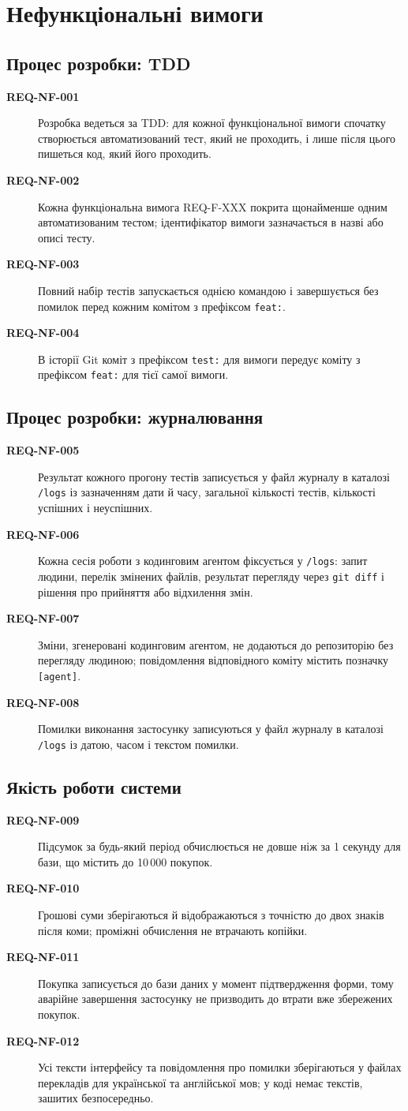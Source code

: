 \documentclass[12pt,a4paper]{article}
\newcommand{\req}[2]{\item[\textbf{#1}] #2}
\begin{document}
\section{Нефункціональні вимоги}

\subsection{Процес розробки: TDD}
\begin{description}
\req{REQ-NF-001}{Розробка ведеться за TDD: для кожної функціональної вимоги спочатку створюється автоматизований тест, який не проходить, і лише після цього пишеться код, який його проходить.}
\req{REQ-NF-002}{Кожна функціональна вимога REQ-F-XXX покрита щонайменше одним автоматизованим тестом; ідентифікатор вимоги зазначається в назві або описі тесту.}
\req{REQ-NF-003}{Повний набір тестів запускається однією командою і завершується без помилок перед кожним комітом з префіксом \texttt{feat:}.}
\req{REQ-NF-004}{В історії Git коміт з префіксом \texttt{test:} для вимоги передує коміту з префіксом \texttt{feat:} для тієї самої вимоги.}
\end{description}

\subsection{Процес розробки: журналювання}
\begin{description}
\req{REQ-NF-005}{Результат кожного прогону тестів записується у файл журналу в каталозі \texttt{/logs} із зазначенням дати й часу, загальної кількості тестів, кількості успішних і неуспішних.}
\req{REQ-NF-006}{Кожна сесія роботи з кодинговим агентом фіксується у \texttt{/logs}: запит людини, перелік змінених файлів, результат перегляду через \texttt{git diff} і рішення про прийняття або відхилення змін.}
\req{REQ-NF-007}{Зміни, згенеровані кодинговим агентом, не додаються до репозиторію без перегляду людиною; повідомлення відповідного коміту містить позначку \texttt{[agent]}.}
\req{REQ-NF-008}{Помилки виконання застосунку записуються у файл журналу в каталозі \texttt{/logs} із датою, часом і текстом помилки.}
\end{description}

\subsection{Якість роботи системи}
\begin{description}
\req{REQ-NF-009}{Підсумок за будь-який період обчислюється не довше ніж за 1 секунду для бази, що містить до 10\,000 покупок.}
\req{REQ-NF-010}{Грошові суми зберігаються й відображаються з точністю до двох знаків після коми; проміжні обчислення не втрачають копійки.}
\req{REQ-NF-011}{Покупка записується до бази даних у момент підтвердження форми, тому аварійне завершення застосунку не призводить до втрати вже збережених покупок.}
\req{REQ-NF-012}{Усі тексти інтерфейсу та повідомлення про помилки зберігаються у файлах перекладів для української та англійської мов; у коді немає текстів, зашитих безпосередньо.}
\end{description}
\end{document}
